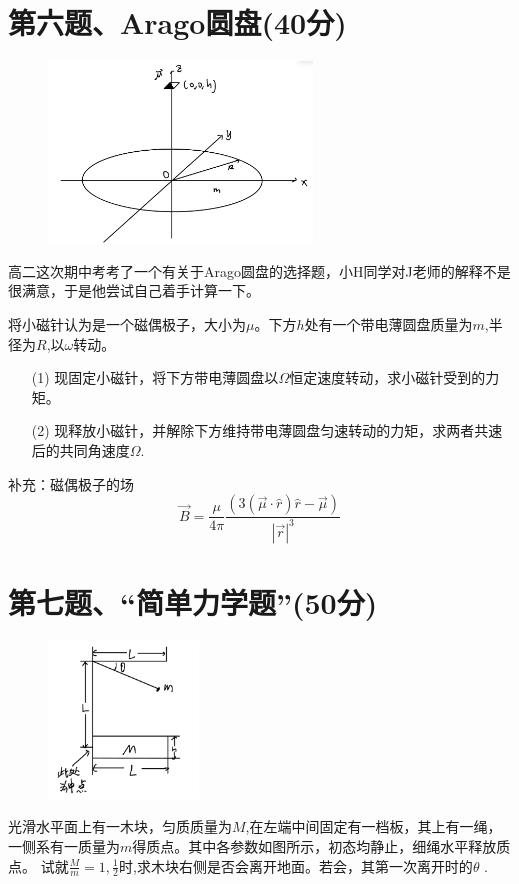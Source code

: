 \documentclass{article}
\begin{document}
\section*{第六题、Arago圆盘(40分)}
\begin{figure}
	\vspace{-15pt}    %
	\includegraphics[width=7cm]{img/6.1.jpeg}\\
	\vspace{-15pt}    %
	\vspace{-15pt}    %
\end{figure}
高二这次期中考考了一个有关于Arago圆盘的选择题，小H同学对J老师的解释不是很满意，于是他尝试自己着手计算一下。\par
将小磁针认为是一个磁偶极子，大小为$\mu$。下方$h$处有一个带电薄圆盘质量为$m$,半径为$R$,以$\omega$转动。
\begin{itemize}
    \item[(1)]现固定小磁针，将下方带电薄圆盘以$\Omega$恒定速度转动，求小磁针受到的力矩。
    \item[(2)]现释放小磁针，并解除下方维持带电薄圆盘匀速转动的力矩，求两者共速后的共同角速度$\Omega$.
\end{itemize}
补充：磁偶极子的场
\[
\vec{B}=\dfrac{\mu}{4\pi}\dfrac{(3(\vec{\mu}\cdot\hat{r})\hat{r}-\vec{\mu})}{|\vec{r}|^3}
\]
\section*{第七题、“简单力学题”(50分)}
\begin{figure}
	\vspace{-15pt}    %
	\includegraphics[width=4cm]{img/7.1.jpeg}\\
	\vspace{-15pt}    %
	\vspace{-15pt}    %
\end{figure}
光滑水平面上有一木块，匀质质量为$M$,在左端中间固定有一档板，其上有一绳，一侧系有一质量为$m$得质点。其中各参数如图所示，初态均静止，细绳水平释放质点。
试就$\frac{M}{m}=1,\frac{1}{2}$时,求木块右侧是否会离开地面。若会，其第一次离开时的$\theta$ .
\end{document}
